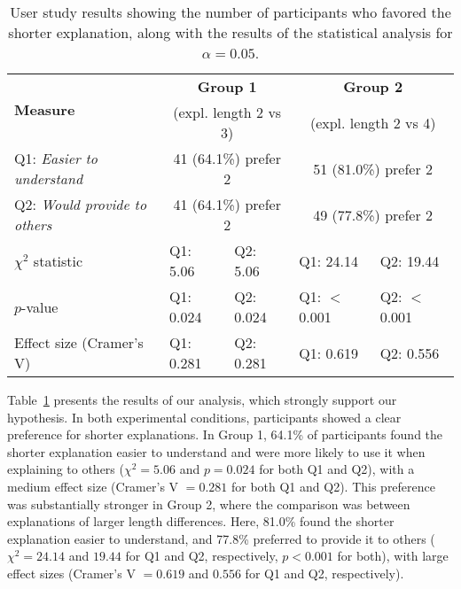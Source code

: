 \documentclass[twoside,11pt]{article}
\begin{document}
\begin{table}[!t]
\centering \footnotesize
\begin{tabular}{|l|ll|ll|}
\hline
\multirow{2}{*}{\textbf{Measure}} & \multicolumn{2}{c|}{\textbf{Group 1}} & \multicolumn{2}{c|}{\textbf{Group 2}} \\
 & \multicolumn{2}{c|}{(expl. length 2 vs 3)} & \multicolumn{2}{c|}{(expl. length 2 vs 4)} \\
\hline
Q1: \textit{Easier to understand}
 & \multicolumn{2}{c|}{41 (64.1\%) prefer 2}
 & \multicolumn{2}{c|}{51 (81.0\%) prefer 2}\\

Q2: \textit{Would provide to others} 
 & \multicolumn{2}{c|}{41 (64.1\%) prefer 2}
 & \multicolumn{2}{c|}{49 (77.8\%) prefer 2} \\
\hdashline

$\chi^2$ statistic   
 & Q1: 5.06 & Q2: 5.06
 & Q1: 24.14 & Q2: 19.44 \\

$p$-value              
 & Q1: 0.024 & Q2: 0.024
 & Q1: $<$ 0.001 & Q2: $<$ 0.001 \\

Effect size (Cramer's V) 
 & Q1: 0.281 & Q2: 0.281 
 & Q1: 0.619 & Q2: 0.556 \\
\hline
\end{tabular}%
\caption{User study results showing the number of participants who favored the shorter explanation, along with the results of the statistical analysis for $\alpha = 0.05$.}
\label{tab:study-results}
\end{table}

Table~\ref{tab:study-results} presents the results of our analysis, which strongly support our hypothesis. In both experimental conditions, participants showed a clear preference for shorter explanations. In Group 1, 64.1\% of participants found the shorter explanation easier to understand and were more likely to use it when explaining to others ($\chi^2 \!=\! 5.06$ and $p \!=\! 0.024$ for both Q1 and Q2), with a medium effect size (Cramer's V $\!=\! 0.281$ for both Q1 and Q2). This preference was substantially stronger in Group 2, where the comparison was between explanations of larger length differences. Here, 81.0\% found the shorter explanation easier to understand, and 77.8\% preferred to provide it to others ($\chi^2 \!=\! 24.14$ and $19.44$ for Q1 and Q2, respectively, $p \!<\! 0.001$ for both), with large effect sizes (Cramer's V $\!=\! 0.619$ and $0.556$ for Q1 and Q2, respectively). %
\end{document}
